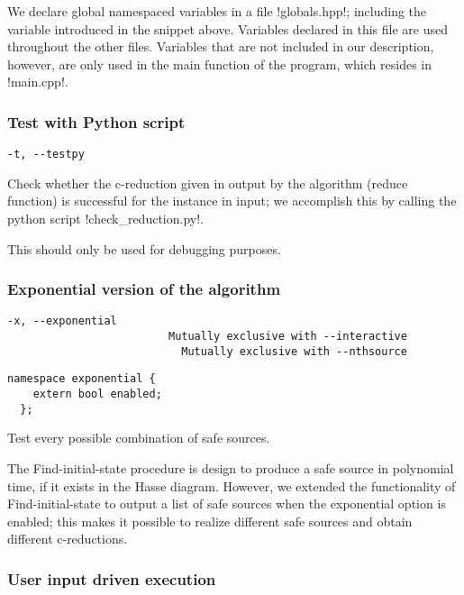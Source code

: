We declare global namespaced variables in a file !globals.hpp!; including the variable introduced in the snippet above.
Variables declared in this file are used throughout the other files.
Variables that are not included in our description, however, are only used in the main function of the program, which resides in !main.cpp!.

\subsubsection*{Test with Python script}

\begin{lstlisting}[aboveskip=\smallskipamount]
  -t, --testpy
\end{lstlisting}

Check whether the c-reduction given in output by the algorithm (reduce function) is successful for the instance in input; we accomplish this by calling the python script !check_reduction.py!.

This should only be used for debugging purposes.

\subsubsection*{Exponential version of the algorithm}

\begin{lstlisting}[aboveskip=\smallskipamount]
  -x, --exponential
                         Mutually exclusive with --interactive
                           Mutually exclusive with --nthsource
\end{lstlisting}

\begin{lstlisting}[style=c++_block, aboveskip=\smallskipamount]
  namespace exponential {
    extern bool enabled;
  };
\end{lstlisting}

Test every possible combination of safe sources.

The Find-initial-state procedure is design to produce a safe source in polynomial time, if it exists in the Hasse diagram.
However, we extended the functionality of Find-initial-state to output a list of safe sources when the exponential option is enabled; this makes it possible to realize different safe sources and obtain different c-reductions.

\subsubsection*{User input driven execution}

